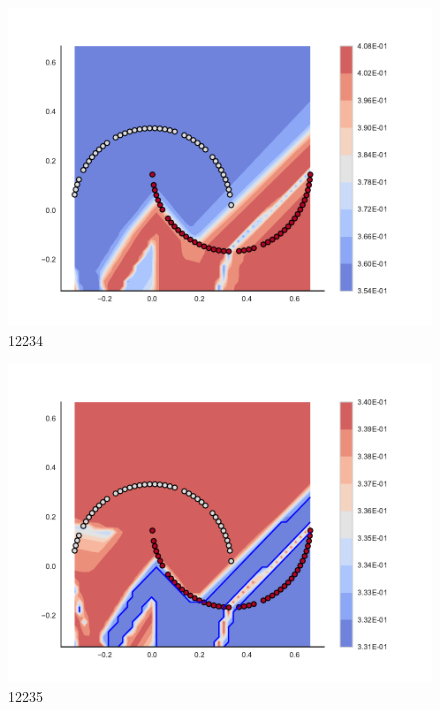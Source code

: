 \begin{subfigure}[b]{0.09\textwidth}
    \includegraphics[clip, trim=2.35cm 1.75cm 4.5cm 0cm,width=\textwidth]{img/convergence/12234.pdf}
    \caption{12234}
    \label{fig:convergence_12234}
\end{subfigure}
%
\begin{subfigure}[b]{0.09\textwidth}
    \includegraphics[clip, trim=2.35cm 1.75cm 4.5cm 0cm,width=\textwidth]{img/convergence/12235.pdf}
    \caption{12235}
    \label{fig:convergence_12235}
\end{subfigure}
%
